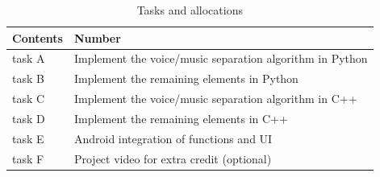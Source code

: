 \documentclass[journal,onecolumn, draftclsnofoot, 12pt]{IEEEtran}
\begin{document}
\begin{table}[h]
\small
    \centering
    \begin{tabular}{|p{1.5in}|p{1.5in}|}
        \hline
        \textbf{Contents} & \textbf{Number} \\
         \hline
        task A &  Implement the voice/music separation algorithm in Python \\
        \hline
        task B &  Implement the remaining elements in Python \\
        \hline
        task C &  Implement the voice/music separation algorithm in C++ \\
        \hline
        task D &  Implement the remaining elements in C++ \\
        \hline
        task E &  Android integration of functions and UI \\
        \hline
        task F &  Project video for extra credit (optional) \\
        \hline
         
    \end{tabular}
    \vspace{0.1in}
    \caption{Tasks and allocations}
    \label{tab:table}
\end{table}
 


 


\end{document}
